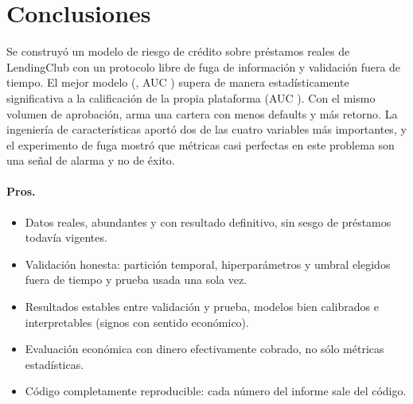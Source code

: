 \documentclass{article}
\begin{document}
\section{Conclusiones}
\label{sec:conclusiones}

Se construyó un modelo de riesgo de crédito sobre \nTotal{} préstamos reales de
LendingClub con un protocolo libre de fuga de información y validación fuera de
tiempo. El mejor modelo (\mejorModelo, AUC \aucMejor) supera de manera
estadísticamente significativa a la calificación de la propia plataforma
(AUC \aucBench). Con el mismo volumen de aprobación, arma una cartera con menos
defaults y más retorno. La ingeniería de características aportó dos de las cuatro
variables más importantes, y el experimento de fuga mostró que métricas casi
perfectas en este problema son una señal de alarma y no de éxito.

\paragraph{Pros.}
\begin{itemize}
  \item Datos reales, abundantes y con resultado definitivo, sin sesgo de
        préstamos todavía vigentes.
  \item Validación honesta: partición temporal, hiperparámetros y umbral elegidos
        fuera de tiempo y prueba usada una sola vez.
  \item Resultados estables entre validación y prueba, modelos bien calibrados e
        interpretables (signos con sentido económico).
  \item Evaluación económica con dinero efectivamente cobrado, no sólo métricas
        estadísticas.
  \item Código completamente reproducible: cada número del informe sale del
        código.
\end{itemize}
\end{document}
